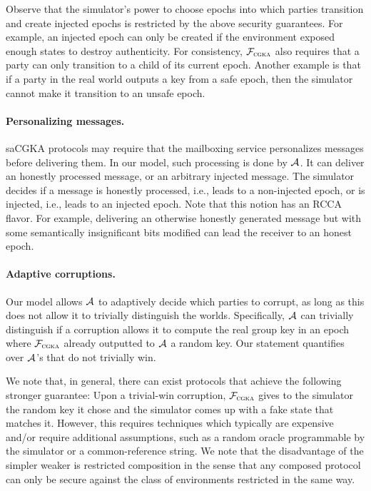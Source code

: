 Observe that the simulator's power to choose epochs into which parties transition and create injected epochs is restricted by the above security guarantees. For example, an injected epoch can only be created if the environment exposed enough states to destroy authenticity. For consistency, $\mathcal{F}_{\normalfont\textsc{cgka}}$ also requires that a party can only transition to a child of its current epoch. Another example is that if a party in the real world outputs a key from a safe epoch, then the simulator cannot make it transition to an unsafe epoch.

\paragraph{Personalizing messages.}
saCGKA protocols may require that the mailboxing service personalizes
messages before delivering them. In our model, such processing is done by
$\mathcal{A}_{\relax}$. It can deliver an honestly processed message, or an arbitrary
injected message. The simulator decides if a message is honestly processed,
i.e., leads to a non-injected epoch, or is injected, i.e., leads to an
injected epoch. Note that this notion has an RCCA flavor. For example,
delivering an otherwise honestly generated message but with some semantically
insignificant bits modified can lead the receiver to an honest epoch.

\paragraph{Adaptive corruptions.}
Our model allows $\mathcal{A}_{\relax}$ to adaptively decide which parties to corrupt, as long as this does not allow it to trivially distinguish the worlds. Specifically, $\mathcal{A}_{\relax}$ can trivially distinguish if a corruption allows it to compute the real group key in an epoch where $\mathcal{F}_{\normalfont\textsc{cgka}}$ already outputted to $\mathcal{A}_{\relax}$ a random key. Our statement quantifies over $\mathcal{A}_{\relax}$'s that do not trivially win.

We note that, in general, there can exist protocols that achieve the following stronger guarantee: Upon a trivial-win
corruption, $\mathcal{F}_{\normalfont\textsc{cgka}}$ gives to the simulator the random key it chose and the simulator comes up with a fake state that
matches it. However, this requires techniques which typically are expensive and/or require additional assumptions, such
as a random oracle programmable by the simulator or a common-reference string. We note that the disadvantage of the
simpler weaker is restricted composition in the sense that any composed protocol can only be secure against the class of environments restricted in the same way.

